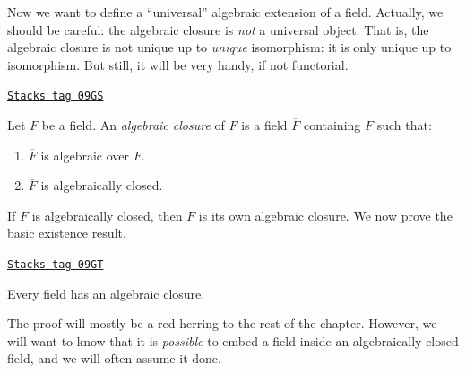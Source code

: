 Now we want to define a ``universal'' algebraic extension of a field.
Actually, we should be careful: the algebraic closure is {\it not} a
universal object. That is, the algebraic closure is not unique up to
{\it unique} isomorphism: it is only unique up to isomorphism. But still,
it will be very handy, if not functorial.

\begin{definition}
\label{fields-definition-algebraic-closure}
\href{https://stacks.math.columbia.edu/tag/09GS}{\texttt{Stacks tag 09GS}}

Let $F$ be a field. An {\it algebraic closure} of $F$ is a field
$\overline{F}$ containing $F$ such that:
\begin{enumerate}
\item $\overline{F}$ is algebraic over $F$.
\item $\overline{F}$ is algebraically closed.
\end{enumerate}
\end{definition}

If $F$ is algebraically closed, then $F$ is its own algebraic closure.
We now prove the basic existence result.

\begin{theorem}
\label{fields-theorem-existence-algebraic-closure}
\href{https://stacks.math.columbia.edu/tag/09GT}{\texttt{Stacks tag 09GT}}

Every field has an algebraic closure.
\end{theorem}

The proof will mostly be a red herring to the rest of the chapter. However, we
will want to know that it is {\it possible} to embed a field inside an
algebraically closed field, and we will often assume it done.

